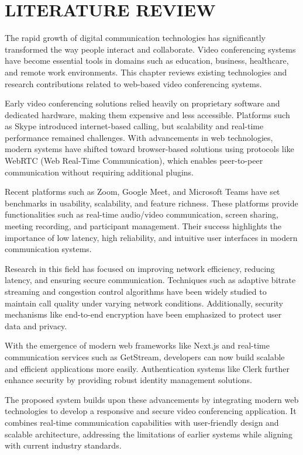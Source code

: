 \chapter{LITERATURE REVIEW}

The rapid growth of digital communication technologies has significantly transformed the way people interact and collaborate. Video conferencing systems have become essential tools in domains such as education, business, healthcare, and remote work environments. This chapter reviews existing technologies and research contributions related to web-based video conferencing systems.

Early video conferencing solutions relied heavily on proprietary software and dedicated hardware, making them expensive and less accessible. Platforms such as Skype introduced internet-based calling, but scalability and real-time performance remained challenges. With advancements in web technologies, modern systems have shifted toward browser-based solutions using protocols like WebRTC (Web Real-Time Communication), which enables peer-to-peer communication without requiring additional plugins.

Recent platforms such as Zoom, Google Meet, and Microsoft Teams have set benchmarks in usability, scalability, and feature richness. These platforms provide functionalities such as real-time audio/video communication, screen sharing, meeting recording, and participant management. Their success highlights the importance of low latency, high reliability, and intuitive user interfaces in modern communication systems.

Research in this field has focused on improving network efficiency, reducing latency, and ensuring secure communication. Techniques such as adaptive bitrate streaming and congestion control algorithms have been widely studied to maintain call quality under varying network conditions. Additionally, security mechanisms like end-to-end encryption have been emphasized to protect user data and privacy.

With the emergence of modern web frameworks like Next.js and real-time communication services such as GetStream, developers can now build scalable and efficient applications more easily. Authentication systems like Clerk further enhance security by providing robust identity management solutions.

The proposed system builds upon these advancements by integrating modern web technologies to develop a responsive and secure video conferencing application. It combines real-time communication capabilities with user-friendly design and scalable architecture, addressing the limitations of earlier systems while aligning with current industry standards.

